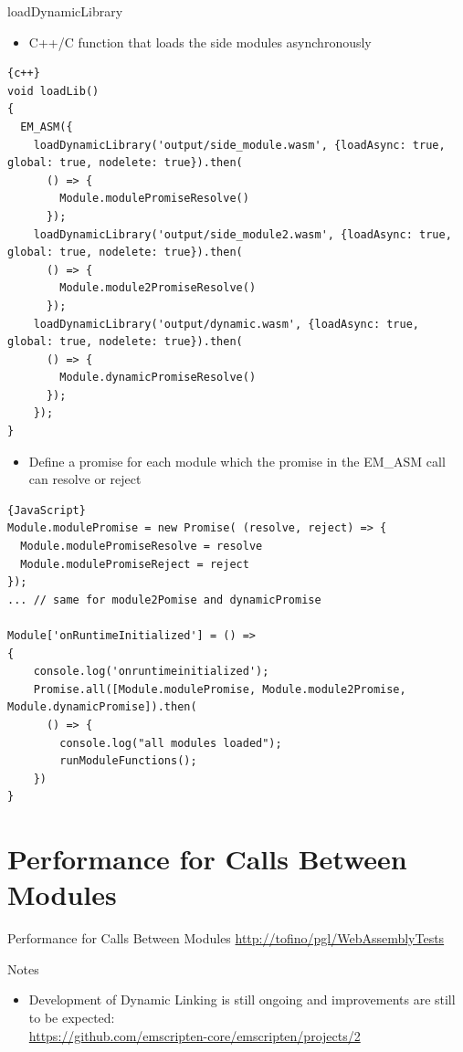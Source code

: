 \documentclass[10pt, a4paper]{beamer} %
\begin{document}
\begin{frame}{loadDynamicLibrary}
  \begin{itemize}
    \item C++/C function that loads the side modules asynchronously
  \end{itemize}
  \begin{lstlisting}{c++}
void loadLib()
{
  EM_ASM({
    loadDynamicLibrary('output/side_module.wasm', {loadAsync: true, global: true, nodelete: true}).then(
      () => {
        Module.modulePromiseResolve() 
      });
    loadDynamicLibrary('output/side_module2.wasm', {loadAsync: true, global: true, nodelete: true}).then(
      () => {
        Module.module2PromiseResolve()
      });
    loadDynamicLibrary('output/dynamic.wasm', {loadAsync: true, global: true, nodelete: true}).then(
      () => {
        Module.dynamicPromiseResolve()
      });
    });
}
  \end{lstlisting}  

  \framebreak
  \begin{itemize}
    \item Define a promise for each module which the promise in the EM\_ASM call can resolve or reject
  \end{itemize}

  \begin{lstlisting}{JavaScript}
Module.modulePromise = new Promise( (resolve, reject) => {
  Module.modulePromiseResolve = resolve
  Module.modulePromiseReject = reject
});
... // same for module2Pomise and dynamicPromise

Module['onRuntimeInitialized'] = () =>
{
    console.log('onruntimeinitialized');
    Promise.all([Module.modulePromise, Module.module2Promise, Module.dynamicPromise]).then(
      () => {
        console.log("all modules loaded");
        runModuleFunctions();
    })
}
  \end{lstlisting}
\end{frame}



\section{Performance for Calls Between Modules}
\begin{frame}{Performance for Calls Between Modules}
  \url{http://tofino/pgl/WebAssemblyTests}
\end{frame}

\begin{frame}{Notes}
  \begin{itemize}
    \item Development of Dynamic Linking is still ongoing and improvements are still to be expected: \\
    \footnotesize{\url{https://github.com/emscripten-core/emscripten/projects/2}}
  \end{itemize}
\end{frame}
\end{document}
